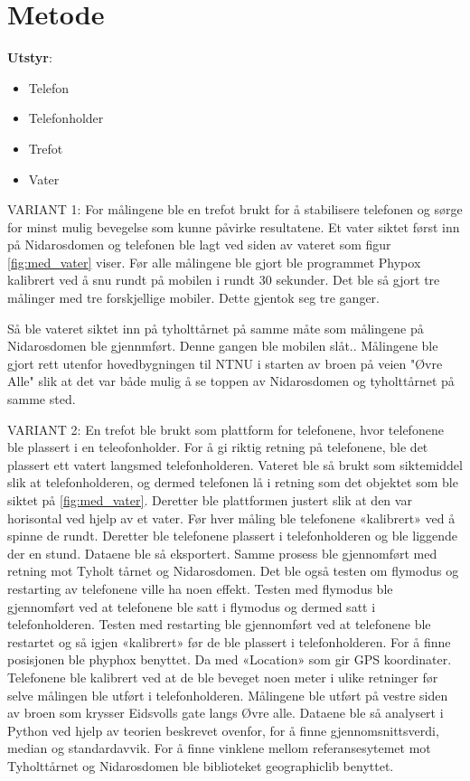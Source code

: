 \section{Metode}
\noindent\textbf{Utstyr}:
\begin{itemize}
    \item Telefon
    \item Telefonholder
    \item Trefot
    \item Vater
\end{itemize}
VARIANT 1:
For målingene ble en trefot brukt for å stabilisere telefonen og sørge for minst mulig bevegelse som kunne påvirke resultatene. Et vater siktet først inn på Nidarosdomen og telefonen ble lagt ved siden av vateret som figur \ref{fig:med_vater} viser. Før alle målingene ble gjort ble programmet Phypox kalibrert ved å snu rundt på mobilen i rundt 30 sekunder. Det ble så gjort tre målinger med tre forskjellige mobiler. Dette gjentok seg tre ganger.

Så ble vateret siktet inn på tyholttårnet på samme måte som målingene på Nidarosdomen ble gjennmført. Denne gangen ble mobilen slåt..
Målingene ble gjort rett utenfor hovedbygningen til NTNU i starten av broen på veien "Øvre Alle" slik at det var både mulig å se toppen av Nidarosdomen og tyholttårnet på samme sted.  \newline


VARIANT 2:
En trefot ble brukt som plattform for telefonene, hvor telefonene ble plassert i en teleofonholder. For å gi riktig retning på telefonene, ble det plassert ett vatert langsmed telefonholderen. Vateret ble så brukt som siktemiddel slik at telefonholderen, og dermed telefonen lå i retning som det objektet som ble siktet på \ref{fig:med_vater}. Deretter ble plattformen justert slik at den var horisontal ved hjelp av et vater. 
Før hver måling ble telefonene «kalibrert» ved å spinne de rundt. Deretter ble telefonene plassert i telefonholderen og ble liggende der en stund. Dataene ble så eksportert. Samme prosess ble gjennomført med retning mot Tyholt tårnet og Nidarosdomen. 
Det ble også testen om flymodus og restarting av telefonene ville ha noen effekt. Testen med flymodus ble gjennomført ved at telefonene ble satt i flymodus og dermed satt i telefonholderen. Testen med restarting ble gjennomført ved at telefonene ble restartet og så igjen «kalibrert» før de ble plassert i telefonholderen.
For å finne posisjonen ble phyphox benyttet. Da med «Location» som gir GPS koordinater. Telefonene ble kalibrert ved at de ble beveget noen meter i ulike retninger før selve målingen ble utført i telefonholderen. Målingene ble utført på vestre siden av broen som krysser Eidsvolls gate langs Øvre alle. 
Dataene ble så analysert i Python ved hjelp av teorien beskrevet ovenfor, for å finne gjennomsnittsverdi, median og standardavvik. For å finne vinklene mellom referansesytemet mot Tyholttårnet og Nidarosdomen ble biblioteket geographiclib benyttet.  

